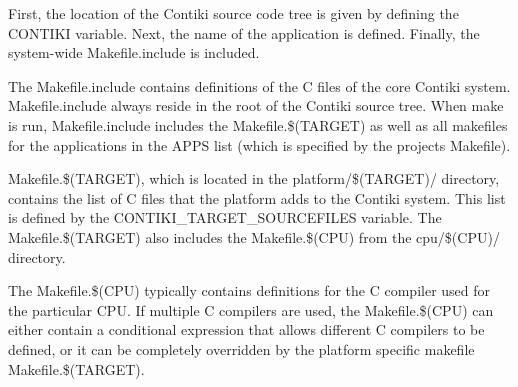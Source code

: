 

First, the location of the Contiki source code tree is given by defining the {\ttfamily C\+O\+N\+T\+I\+KI} variable. Next, the name of the application is defined. Finally, the system-\/wide {\ttfamily Makefile.\+include} is included.

The {\ttfamily Makefile.\+include} contains definitions of the C files of the core Contiki system. {\ttfamily Makefile.\+include} always reside in the root of the Contiki source tree. When {\ttfamily make} is run, {\ttfamily Makefile.\+include} includes the {\ttfamily Makefile.\$(T\+A\+R\+G\+ET)} as well as all makefiles for the applications in the {\ttfamily A\+P\+PS} list (which is specified by the project\textquotesingle{}s {\ttfamily Makefile}).

{\ttfamily Makefile.\$(T\+A\+R\+G\+ET)}, which is located in the platform/\$(T\+A\+R\+G\+ET)/ directory, contains the list of C files that the platform adds to the Contiki system. This list is defined by the {\ttfamily C\+O\+N\+T\+I\+K\+I\+\_\+\+T\+A\+R\+G\+E\+T\+\_\+\+S\+O\+U\+R\+C\+E\+F\+I\+L\+ES} variable. The {\ttfamily Makefile.\$(T\+A\+R\+G\+ET)} also includes the {\ttfamily Makefile.\$(C\+PU)} from the cpu/\$(C\+PU)/ directory.

The {\ttfamily Makefile.\$(C\+PU)} typically contains definitions for the C compiler used for the particular C\+PU. If multiple C compilers are used, the {\ttfamily Makefile.\$(C\+PU)} can either contain a conditional expression that allows different C compilers to be defined, or it can be completely overridden by the platform specific makefile {\ttfamily Makefile.\$(T\+A\+R\+G\+ET)}. 